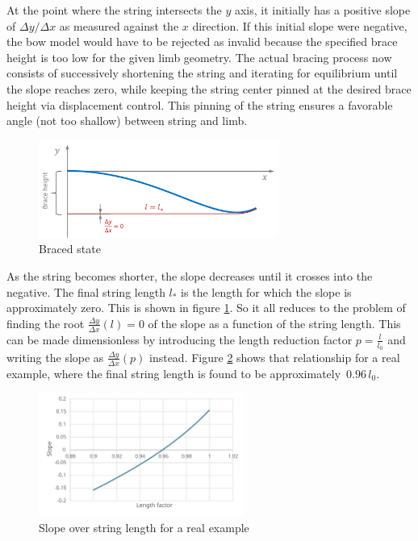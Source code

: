 At the point where the string intersects the $y$ axis, it initially has a positive slope of $\Delta y / \Delta x$ as measured against the $x$ direction.
If this initial slope were negative, the bow model would have to be rejected as invalid because the specified brace height is too low for the given limb geometry.
The actual bracing process now consists of successively shortening the string and iterating for equilibrium until the slope reaches zero, while keeping the string center pinned at the desired brace height via displacement control.
This pinning of the string ensures a favorable angle (not too shallow) between string and limb.

\begin{figure}[h]
\centering
\includegraphics[width=0.7\textwidth]{figures/solution/bracing-method-2}
\caption{Braced state}
\label{fig:bracing-method-2}
\end{figure}

As the string becomes shorter, the slope decreases until it crosses into the negative.
The final string length $l_*$ is the length for which the slope is approximately zero.
This is shown in figure \ref{fig:bracing-method-2}.
So it all reduces to the problem of finding the root $\frac{\Delta y}{\Delta x}(l) = 0$ of the slope as a function of the string length.
This can be made dimensionless by introducing the length reduction factor $p = \frac{l}{l_{0}}$ and writing the slope as $\frac{\Delta y}{\Delta x}(p)$ instead.
Figure \ref{fig:bracing-plot} shows that relationship for a real example, where the final string length is found to be approximately~$0.96\,l_{0}$.

\begin{figure}[h]
\centering
\includegraphics[width=0.6\textwidth]{figures/solution/bracing-plot}
\caption{Slope over string length for a real example}
\label{fig:bracing-plot}
\end{figure}

